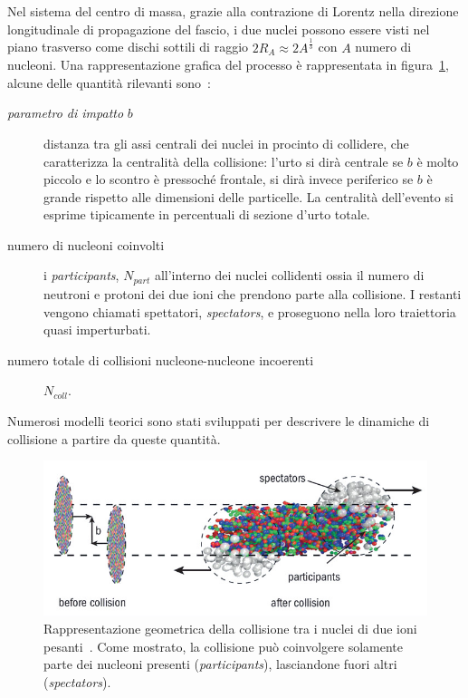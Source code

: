         Nel sistema del centro di massa, grazie alla contrazione di Lorentz nella direzione longitudinale di propagazione del fascio, i due nuclei possono essere visti nel piano trasverso come dischi sottili di raggio $2 R_A \approx 2 A^{\frac{1}{3}}$ con $A$ numero di nucleoni. Una rappresentazione grafica del processo è rappresentata in figura~\ref{fig:4-centrality}, alcune delle quantità rilevanti sono~\cite{Salgado_2009}:
        \begin{description}
            \item[\textit{parametro di impatto} $b$] distanza tra gli assi centrali dei nuclei in procinto di collidere, che caratterizza la centralità della collisione: l'urto si dirà centrale se $b$ è molto piccolo e lo scontro è pressoché frontale, si dirà invece periferico se $b$ è grande rispetto alle dimensioni delle particelle. La centralità dell'evento si esprime tipicamente in percentuali di sezione d'urto totale.
            
            \item[numero di nucleoni coinvolti] i \textit{participants}, $N_{part}$ all'interno dei nuclei collidenti ossia il numero di neutroni e protoni dei due ioni che prendono parte alla collisione. I restanti vengono chiamati spettatori, \textit{spectators}, e proseguono nella loro traiettoria quasi imperturbati. 
            
            \item[numero totale di collisioni nucleone-nucleone incoerenti] $N_{coll}$.
        \end{description}
        Numerosi modelli teorici sono stati sviluppati per descrivere le dinamiche di collisione a partire da queste quantità.

        \begin{figure}[t]
            \centering
            \includegraphics[width=0.8\linewidth]{res/fig/1-chapter/4-centrality.png}
            \caption{Rappresentazione geometrica della collisione tra i nuclei di due ioni pesanti~\cite{Toia_2013}. Come mostrato, la collisione può coinvolgere solamente parte dei nucleoni presenti (\textit{participants}), lasciandone fuori altri (\textit{spectators}).}
            \label{fig:4-centrality}
        \end{figure}

